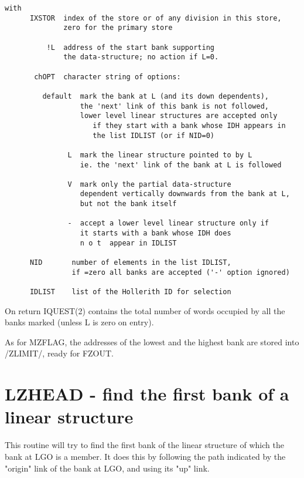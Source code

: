 \begin{verbatim}
with
      IXSTOR  index of the store or of any division in this store,
              zero for the primary store

          !L  address of the start bank supporting
              the data-structure; no action if L=0.

       chOPT  character string of options:

         default  mark the bank at L (and its down dependents),
                  the 'next' link of this bank is not followed,
                  lower level linear structures are accepted only
                     if they start with a bank whose IDH appears in
                     the list IDLIST (or if NID=0)

               L  mark the linear structure pointed to by L
                  ie. the 'next' link of the bank at L is followed

               V  mark only the partial data-structure
                  dependent vertically downwards from the bank at L,
                  but not the bank itself

               -  accept a lower level linear structure only if
                  it starts with a bank whose IDH does
                  n o t  appear in IDLIST

      NID       number of elements in the list IDLIST,
                if =zero all banks are accepted ('-' option ignored)

      IDLIST    list of the Hollerith ID for selection
\end{verbatim} 

On return IQUEST(2) contains the total number of words
occupied by all the banks marked (unless L is zero on entry).

As for MZFLAG, the addresses of the lowest and the highest
bank are stored into /ZLIMIT/, ready for FZOUT.

\section{LZHEAD - find the first bank of a linear structure}

This routine will try to find the first bank of the linear
structure of which the bank at LGO is a member.
It does this by following the path indicated by the "origin"
link of the bank at LGO, and using its "up" link.



